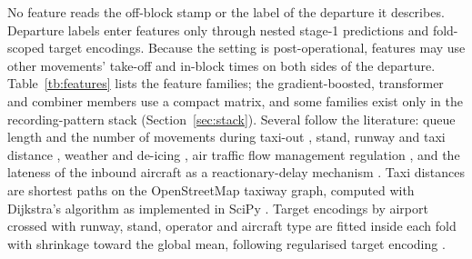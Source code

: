 \documentclass[
  manuscript=article,  %
  layout=preprint,  %
  year=20xx,
  volume=x,
]{extra/joas}
\begin{document}
No feature reads the off-block stamp or the label of the departure it describes. Departure labels enter features only through nested stage-1 predictions and fold-scoped target encodings. Because the setting is post-operational, features may use other movements' take-off and in-block times on both sides of the departure. Table~\ref{tb:features} lists the feature families; the gradient-boosted, transformer and combiner members use a compact matrix, and some families exist only in the recording-pattern stack (Section~\ref{sec:stack}). Several follow the literature: queue length and the number of movements during taxi-out \cite{idris2002queuing,clewlow2010impact,wang2021aircraft}, stand, runway and taxi distance \cite{jordan2010statistical,lordan2016forecasting,kato2022applying}, weather and de-icing \cite{eurocontrol2011algorithm,schultz2018weather}, air traffic flow management regulation \cite{yuan2024additional}, and the lateness of the inbound aircraft as a reactionary-delay mechanism \cite{ahmadbeygi2008analysis,kafle2016modeling,eurocontrol2025allcauses}. Taxi distances are shortest paths on the OpenStreetMap taxiway graph, computed with Dijkstra's algorithm \cite{dijkstra1959note} as implemented in SciPy \cite{virtanen2020scipy}. Target encodings by airport crossed with runway, stand, operator and aircraft type are fitted inside each fold with shrinkage toward the global mean, following regularised target encoding \cite{miccibarreca2001preprocessing,pargent2022regularized}.
\end{document}
